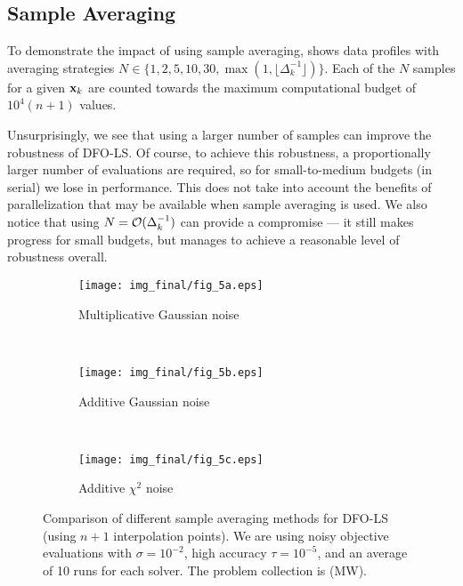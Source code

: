 \subsection{Sample Averaging} \label{sec_averaging}
To demonstrate the impact of using sample averaging,  shows data profiles
 with averaging strategies $N\in\{1, 2, 5, 10, 30, \max(1,\lfloor\Delta_k^{-1}\rfloor)\}$.
Each of the $N$ samples for a given $\mathbf{x}_k$ are counted towards the maximum computational budget of $10^4 (n+1)$ values.

Unsurprisingly, we see that using a larger number of samples can improve the robustness of DFO-LS.
Of course, to achieve this robustness, a proportionally larger number of evaluations are required, so for small-to-medium budgets (in serial) we lose in performance.
This does not take into account the benefits of parallelization that may be available when sample averaging is used. 
We also notice that using $N=\mathcal{O}(\Delta_k^{-1})$ can provide a compromise --- it still makes progress for small budgets, but manages to achieve a reasonable level of robustness overall.

\begin{figure}[t]
	\centering
	\begin{subfigure}[b]{0.48\textwidth}
		\texttt{[image: img\_final/fig\_5a.eps]}
		\caption{Multiplicative Gaussian noise}
		\label{fig_avg_noise2_ubgsn_noisyf}
	\end{subfigure}
	~
	\begin{subfigure}[b]{0.48\textwidth}
		\texttt{[image: img\_final/fig\_5b.eps]}
		\caption{Additive Gaussian noise}
		\label{fig_avg_noise2_addgsn_noisyf}
	\end{subfigure}
	\\
	\begin{subfigure}[b]{0.48\textwidth}
		\texttt{[image: img\_final/fig\_5c.eps]}
		\caption{Additive $\chi^2$ noise}
		\label{fig_avg_noise2_addchisq_noisyf}
	\end{subfigure}
	\caption{Comparison of different sample averaging methods for DFO-LS (using $n+1$ interpolation points). We are using noisy objective evaluations with $\sigma=10^{-2}$, high accuracy $\tau=10^{-5}$, and an average of 10 runs for each solver. The problem collection is (MW).}
	\label{fig_avg_noise2}
\end{figure}

